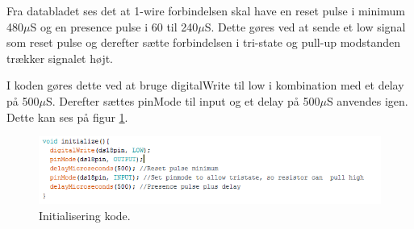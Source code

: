 Fra databladet ses det at 1-wire forbindelsen skal have en reset pulse i minimum 480$\mu$S og en presence pulse i 60 til 240$\mu$S. Dette gøres ved at sende et low signal som reset pulse og derefter sætte forbindelsen i tri-state og pull-up modstanden trækker signalet højt. 

I koden gøres dette ved at bruge digitalWrite til low i kombination med et delay på 500$\mu$S. Derefter sættes pinMode til input og et delay på 500$\mu$S anvendes igen. Dette kan ses på figur \ref{sensor_kode}.

\begin{figure}[h!]
  \centering
  \includegraphics[width=1\textwidth]{figures/Init.png}
  \caption{Initialisering kode.}
  \label{sensor_kode}
\end{figure}